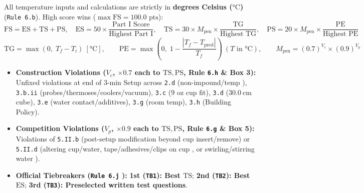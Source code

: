 \begin{formulacard}
\setlength{\abovedisplayskip}{2pt}\setlength{\belowdisplayskip}{2pt}
All temperature inputs and calculations are strictly in \textbf{degrees Celsius ($\si{\celsius}$)} (\texttt{Rule 6.b}). High score wins ($\max \mathrm{FS} = 100.0\text{ pts}$):
\begin{equation}\label{eq:00:fs}
  \mathrm{FS} = \mathrm{ES} + \mathrm{TS} + \mathrm{PS}, \quad
  \mathrm{ES} = 50 \times \frac{\text{Part I Score}}{\text{Highest Part I}}, \quad
  \mathrm{TS} = 30 \times M_{\mathrm{pen}} \times \frac{\mathrm{TG}}{\text{Highest }\mathrm{TG}}, \quad
  \mathrm{PS} = 20 \times M_{\mathrm{pen}} \times \frac{\mathrm{PE}}{\text{Highest }\mathrm{PE}}
\end{equation}
\begin{equation}\label{eq:00:tg-pe}
  \mathrm{TG} = \max\!\left(0,\; T_f - T_i\right)\ [\si{\celsius}], \qquad
  \mathrm{PE} = \max\!\left(0,\; 1 - \frac{\left|T_f - T_{\mathrm{pred}}\right|}{T_f}\right)\ \left(T \text{ in }\si{\celsius}\right), \qquad
  M_{\mathrm{pen}} = (0.7)^{V_c} \times (0.9)^{V_p}
\end{equation}
\begin{itemize}
  \item \textbf{Construction Violations ($V_c$, $\times 0.7$ each to $\mathrm{TS},\mathrm{PS}$, Rule \texttt{6.h} \& Box 3):} Unfixed violations at end of 3-min Setup across \texttt{2.d} (non-impound/temp ), \texttt{3.b.ii} (probes/thermoses/coolers/vacuum), \texttt{3.c} (9 oz cup fit), \texttt{3.d} ($\SI{30.0}{\centi\meter}$ cube), \texttt{3.e} (water contact/additives), \texttt{3.g} (room temp), \texttt{3.h} (Building Policy).
  \item \textbf{Competition Violations ($V_p$, $\times 0.9$ each to $\mathrm{TS},\mathrm{PS}$, Rule \texttt{6.g} \& Box 5):} Violations of \texttt{5.II.b} (post-setup modification beyond cup insert/remove) or \texttt{5.II.d} (altering cup/water, tape/adhesives/clips on cup , or swirling/stirring water ).
  \item \textbf{Official Tiebreakers (\texttt{Rule 6.j} ):} \textbf{1st (\texttt{TB1}): Best $\mathrm{TS}$}; \textbf{2nd (\texttt{TB2}): Best $\mathrm{ES}$}; \textbf{3rd (\texttt{TB3}): Preselected written test questions}.
\end{itemize}
\end{formulacard}

